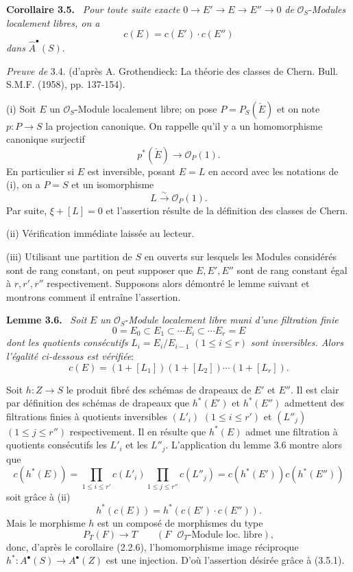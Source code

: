 \documentclass[11pt]{article}
\newenvironment{statement}[1]{\par\medskip\noindent\textbf{#1.}\ }{\par\medskip}
\begin{document}
\begin{statement}{Corollaire 3.5}
\emph{Pour toute suite exacte} $0\to E'\to E\to E''\to0$ \emph{de} $\mathcal O_S$-\emph{Modules localement libres, on a}
\[
c(E)=c(E')\cdot c(E'')
\]
\emph{dans} $\widehat A^{\bullet}(S)$.
\end{statement}

\emph{Preuve de} 3.4. (d'après A. Grothendieck: La théorie des classes de Chern. Bull. S.M.F. (1958), pp. 137-154).

(i)
Soit $E$ un $\mathcal O_S$-Module localement libre; on pose $P=P_S(\check E)$ et on note $p:P\to S$ la projection canonique. On rappelle qu'il y a un homomorphisme canonique surjectif
\[
p^*(\check E)\longrightarrow \mathcal O_P(1).
\]
En particulier si $E$ est inversible, posant $E=L$ en accord avec les notations de (i), on a $P=S$ et un isomorphisme
\[
L\xrightarrow{\sim}\mathcal O_P(1).
\]
Par suite, $\xi+[L]=0$ et l'assertion résulte de la définition des classes de Chern.

(ii) Vérification immédiate laissée au lecteur.

(iii) Utilisant une partition de $S$ en ouverts sur lesquels les Modules considérés sont de rang constant, on peut supposer que $E,E',E''$ sont de rang constant égal à $r,r',r''$ respectivement. Supposons alors démontré le lemme suivant et montrons comment il entraîne l'assertion.

\begin{statement}{Lemme 3.6}
\emph{Soit} $E$ \emph{un} $\mathcal O_S$-\emph{Module localement libre muni d'une filtration finie}
\[
0=E_0\subset E_1\subset\cdots E_i\subset\cdots E_r=E
\]
\emph{dont les quotients consécutifs} $L_i=E_i/E_{i-1}$ $(1\le i\le r)$ \emph{sont inversibles. Alors l'égalité ci-dessous est vérifiée}:
\[
c(E)=(1+[L_1])(1+[L_2])\cdots(1+[L_r]).
\]
\end{statement}

Soit $h:Z\to S$ le produit fibré des schémas de drapeaux de $E'$ et $E''$. Il est clair par définition des schémas de drapeaux que $h^*(E')$ et $h^*(E'')$ admettent des filtrations finies à quotients inversibles $(L'_i)$ $(1\le i\le r')$ et $(L''_j)$ $(1\le j\le r'')$ respectivement. Il en résulte que $h^*(E)$ admet une filtration à quotients consécutifs les $L'_i$ et les $L''_j$. L'application du lemme 3.6 montre alors que
\[
c(h^*(E))=
\prod_{1\le i\le r'}c(L'_i)\prod_{1\le j\le r''}c(L''_j)
=c(h^*(E'))c(h^*(E''))
\]
soit grâce à (ii)
\[
h^*(c(E))=h^*(c(E')\cdot c(E'')).
\tag{3.5.1.}
\]
Mais le morphisme $h$ est un composé de morphismes du type
\[
P_T(F)\longrightarrow T
\qquad (F\text{ }\mathcal O_T\text{-Module loc. libre}),
\]
donc, d'après le corollaire (2.2.6), l'homomorphisme image réciproque $h^*:A^{\bullet}(S)\to A^{\bullet}(Z)$ est une injection. D'où l'assertion désirée grâce à (3.5.1).
\end{document}
